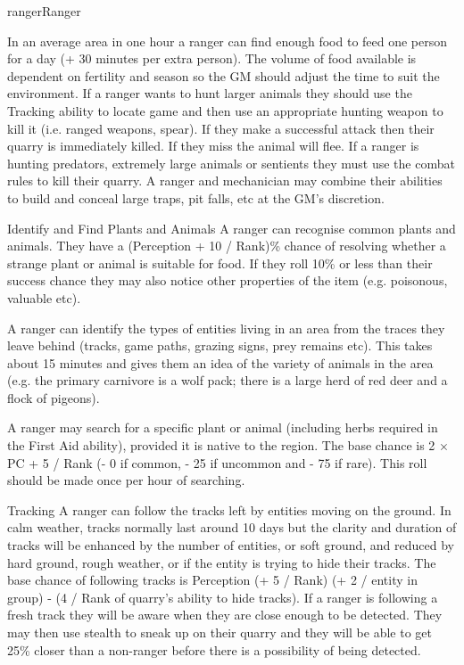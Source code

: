\begin{Skill}[2.1]{ranger}{Ranger}
\begin{Description}
  In an average area in one hour a ranger can find enough food to feed
  one person for a day (+ 30 minutes per extra person).  The volume of
  food available is dependent on fertility and season so the GM should
  adjust the time to suit the environment.  If a ranger wants to hunt
  larger animals they should use the Tracking ability to locate game
  and then use an appropriate hunting weapon to kill it (i.e.  ranged
  weapons, spear).  If they make a successful attack then their quarry
  is immediately killed.  If they miss the animal will flee.  If a
  ranger is hunting predators, extremely large animals or sentients
  they must use the combat rules to kill their quarry.  A ranger and
  mechanician may combine their abilities to build and conceal large
  traps, pit falls, etc at the GM’s discretion.

\item[Identify and Find Plants and Animals] A ranger can recognise
  common plants and animals.  They have a (Perception + 10 / Rank)\%
  chance of resolving whether a strange plant or animal is suitable
  for food.  If they roll 10\% or less than their success chance they
  may also notice other properties of the item (e.g. poisonous,
  valuable etc).

  A ranger can identify the types of entities living in an area from
  the traces they leave behind (tracks, game paths, grazing signs,
  prey remains etc).  This takes about 15 minutes and gives them an
  idea of the variety of animals in the area (e.g. the primary
  carnivore is a wolf pack; there is a large herd of red deer and a
  flock of pigeons).

  A ranger may search for a specific plant or animal (including herbs
  required in the First Aid ability), provided it is native to the
  region. The base chance is 2 × PC + 5 / Rank (- 0 if common, - 25 if
  uncommon and - 75 if rare). This roll should be made once per hour
  of searching.

\item[Tracking] A ranger can follow the tracks left by entities moving
  on the ground.  In calm weather, tracks normally last around 10 days
  but the clarity and duration of tracks will be enhanced by the
  number of entities, or soft ground, and reduced by hard ground,
  rough weather, or if the entity is trying to hide their tracks.  The
  base chance of following tracks is Perception (+ 5 / Rank) (+ 2 /
  entity in group) - (4 / Rank of quarry’s ability to hide tracks).
  If a ranger is following a fresh track they will be aware when they
  are close enough to be detected.  They may then use stealth to sneak
  up on their quarry and they will be able to get 25\% closer than a
  non-ranger before there is a possibility of being detected.


\end{Description}
\end{Skill}
